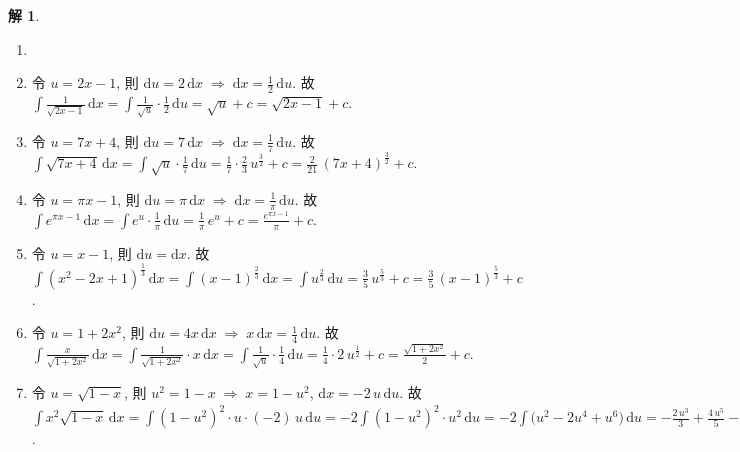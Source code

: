 \documentclass[12pt,a4paper]{extarticle}
\newcommand{\ds}{\displaystyle}
\newcommand{\ie}{\;\Longrightarrow\;}
\theoremstyle{definition}
\newtheorem*{sol}{解}
\begin{document}
\begin{sol}
  \begin{enumerate}\setlength{\itemsep}{0pt}
    \item[]
    \item 令 $u = 2x - 1$, 則 $\ds\text{d}u = 2\,\text{d}x\ie \text{d}x = \frac{1}{2}\,\text{d}u$. 故 $\ds\int\!\frac{1}{\sqrt{2 x - 1}}\,\mathrm{d}x = \int\!\frac{1}{\sqrt{u}}\cdot\frac{1}{2}\,\text{d}u = \sqrt{u} + c = \sqrt{2 x - 1} + c$. 
    \item 令 $u = 7x + 4$, 則 $\ds\text{d}u = 7\,\text{d}x\ie \text{d}x = \frac{1}{7}\,\text{d}u$. 故 $\ds\int\!\sqrt{7 x + 4}\,\mathrm{d}x = \int\!\sqrt{u}\cdot\frac{1}{7}\,\text{d}u = \frac{1}{7}\cdot\frac{2}{3}\,u^{\frac{3}{2}} + c = \frac{2}{21}\,(7 x + 4)^{\frac{3}{2}} + c$. 
    \item 令 $u = \pi x - 1$, 則 $\ds\text{d}u = \pi\,\text{d}x\ie \text{d}x = \frac{1}{\pi}\,\text{d}u$. 故 $\ds\int\!e^{\pi x - 1}\,\mathrm{d}x = \int\!e^u\cdot\frac{1}{\pi}\,\text{d}u = \frac{1}{\pi}\,e^{u} + c = \frac{e^{\pi x - 1}}{\pi} + c$. 
    \item 令 $\ds u = x - 1$, 則 $\ds\text{d}u = \text{d}x$. 故 $\ds\int\!(x^2 - 2x + 1)^{\frac{1}{3}}\,\mathrm{d}x = \int\!(x - 1)^\frac{2}{3}\,\text{d}x = \int\!u^\frac{2}{3}\,\text{d}u = \frac{3}{5}\,u^\frac{5}{3} + c = \frac{3}{5}\,(x - 1)^\frac{5}{3} + c$. 
    \item 令 $\ds u = 1 + 2x^2$, 則 $\ds\text{d}u = 4x\,\text{d}x\ie x\,\text{d}x = \frac{1}{4}\,\text{d}u$. 故 $\ds\int\!\frac{x}{\sqrt{1 + 2x^2}}\,\mathrm{d}x = \int\!\frac{1}{\sqrt{1 + 2x^2}}\cdot x\,\mathrm{d}x = \int\!\frac{1}{\sqrt{u}}\cdot\frac{1}{4}\,\text{d}u = \frac{1}{4}\cdot 2\,u^\frac{1}{2} + c = \frac{\sqrt{1 + 2x^2}}{2} + c$. 
    \item 令 $\ds u = \sqrt{1 - x}$, 則 $\ds u^2 = 1 - x\ie x = 1 - u^2$, $\text{d}x = -2\,u\,\text{d}u$. 故 $\ds\int\!x^2\sqrt{1 - x}\,\mathrm{d}x = \int\!(1 - u^2)^2\cdot u\cdot(-2)\,u\,\mathrm{d}u = -2\int\!(1 - u^2)^2\cdot u^2\,\text{d}u = -2\int\!\big(u^2 - 2u^4 + u^6\big)\,\text{d}u = -\frac{2\,u^3}{3} + \frac{4\,u^5}{5} - \frac{2\,u^7}{7} + c = -\frac{2\,(1 - x)^{\frac{3}{2}}}{3} + \frac{4\,(1 - x)^{\frac{5}{2}}}{5} - \frac{2\,(1 - x)^{\frac{7}{2}}}{7}$. 
  \end{enumerate}
\end{sol}
\end{document}
